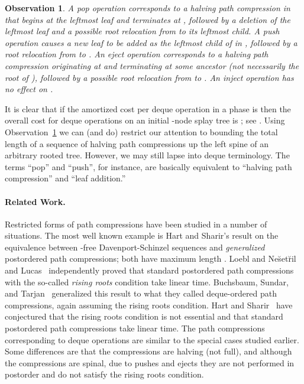 \documentclass{article}
\newtheorem{observation}[theorem]{Observation}
\newcommand{\Nesetril}{Ne{\u{s}}et{\u{r}}il}
\begin{document}
\begin{observation}\label{obs:equiv}
A pop operation corresponds to a halving path compression in  that begins at the leftmost leaf and terminates at ,
followed by a deletion of the leftmost leaf and a possible {\em root relocation} from  to its leftmost child.
A push operation causes a new leaf  to be added as the leftmost child of  in , followed by a root relocation from  to .
An eject operation corresponds to a halving path compression originating at  and terminating at some ancestor (not necessarily the root of ),
followed by a possible root relocation from  to .  An inject operation has no effect on .
\end{observation}

It is clear that if the amortized cost per deque operation in a phase is  then the overall cost for  deque operations
on an initial -node splay tree is ; see \cite{Tar85,Sundar92,Elmasry04b}.
Using Observation~\ref{obs:equiv} we can (and do) restrict our attention to bounding the total length of a sequence of halving path
compressions up the left spine of an arbitrary rooted tree.  However, we may still lapse into deque terminology.  The terms
``pop'' and ``push'', for instance, are basically equivalent to ``halving path compression'' and ``leaf addition.''

\paragraph{Related Work.}
Restricted forms of path compressions have been studied in a number of situations.
The most well known example is Hart and Sharir's result \cite{HS86} on the equivalence between
-free Davenport-Schinzel sequences and {\em generalized} postordered path compressions;
both have maximum length .  Loebl and \Nesetril{} \cite{LN97} and Lucas~\cite{Lucas90} independently proved
that standard postordered path compressions with the so-called {\em rising roots} condition take linear time.
Buchsbaum, Sundar, and Tarjan~\cite{B+95} generalized this result to what they called deque-ordered path compressions,
again assuming the rising roots condition.  Hart and Sharir~\cite{HS86} have conjectured that the rising roots condition 
is not essential and that standard postordered path compressions take linear time.
The path compressions corresponding to deque operations 
are similar to the special cases studied earlier.  Some differences are that the compressions are halving (not full),
and although the compressions are spinal, due to pushes and ejects they are not performed in postorder
and do not satisfy the rising roots condition.
\end{document}
